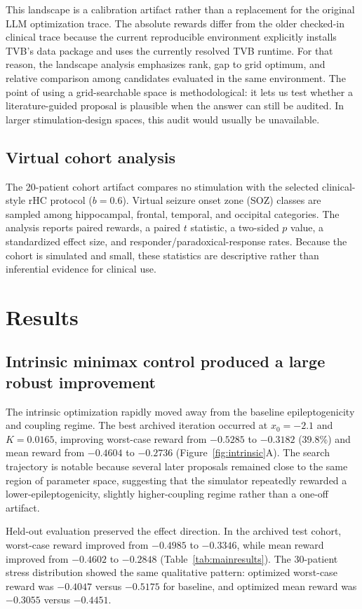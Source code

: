 \documentclass{article}
\begin{document}
This landscape is a calibration artifact rather than a replacement for the original LLM optimization trace. The absolute rewards differ from the older checked-in clinical trace because the current reproducible environment explicitly installs TVB's data package and uses the currently resolved TVB runtime. For that reason, the landscape analysis emphasizes rank, gap to grid optimum, and relative comparison among candidates evaluated in the same environment. The point of using a grid-searchable space is methodological: it lets us test whether a literature-guided proposal is plausible when the answer can still be audited. In larger stimulation-design spaces, this audit would usually be unavailable.

\subsection{Virtual cohort analysis}
The 20-patient cohort artifact compares no stimulation with the selected clinical-style rHC protocol ($b=0.6$). Virtual seizure onset zone (SOZ) classes are sampled among hippocampal, frontal, temporal, and occipital categories. The analysis reports paired rewards, a paired $t$ statistic, a two-sided $p$ value, a standardized effect size, and responder/paradoxical-response rates. Because the cohort is simulated and small, these statistics are descriptive rather than inferential evidence for clinical use.

\section{Results}
\subsection{Intrinsic minimax control produced a large robust improvement}
The intrinsic optimization rapidly moved away from the baseline epileptogenicity and coupling regime. The best archived iteration occurred at $x_0=-2.1$ and $K=0.0165$, improving worst-case reward from $-0.5285$ to $-0.3182$ (39.8\%) and mean reward from $-0.4604$ to $-0.2736$ (Figure~\ref{fig:intrinsic}A). The search trajectory is notable because several later proposals remained close to the same region of parameter space, suggesting that the simulator repeatedly rewarded a lower-epileptogenicity, slightly higher-coupling regime rather than a one-off artifact.

Held-out evaluation preserved the effect direction. In the archived test cohort, worst-case reward improved from $-0.4985$ to $-0.3346$, while mean reward improved from $-0.4602$ to $-0.2848$ (Table~\ref{tab:mainresults}). The 30-patient stress distribution showed the same qualitative pattern: optimized worst-case reward was $-0.4047$ versus $-0.5175$ for baseline, and optimized mean reward was $-0.3055$ versus $-0.4451$.
\end{document}
